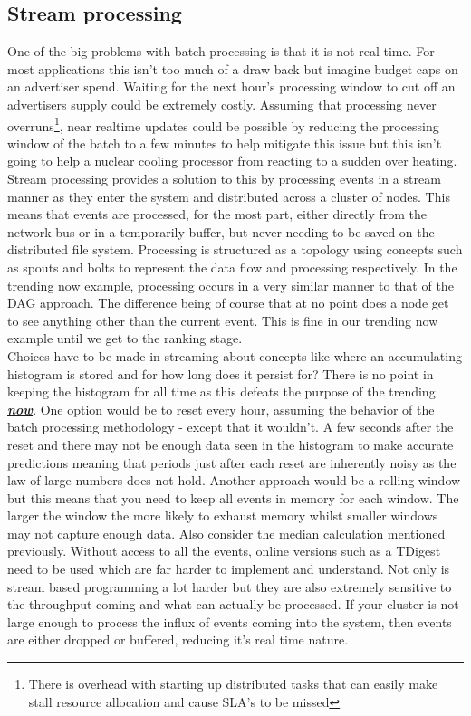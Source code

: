 \documentclass[a4paper,11pt]{scrreprt}
\begin{document}
\subsection{Stream processing}
One of the big problems with batch processing is that it is not real time. For most applications this isn't too much of a draw back but imagine budget caps on an advertiser spend. Waiting for the next hour's processing window to cut off an advertisers supply could be extremely costly. Assuming that processing never overruns\footnote{There is overhead with starting up distributed tasks that can easily make stall resource allocation and cause SLA's to be missed}, near realtime updates could be possible by reducing the processing window of the batch to a few minutes to help mitigate this issue but this isn't going to help a nuclear cooling processor from reacting to a sudden over heating. Stream processing provides a solution to this by processing events in a stream manner as they enter the system and distributed across a cluster of nodes. This means that events are processed, for the most part, either directly from the network bus or in a temporarily buffer, but never needing to be saved on the distributed file system. Processing is structured as a topology using concepts such as spouts and bolts to represent the data flow and processing respectively. In the trending now example, processing occurs in a very similar manner to that of the DAG approach. The difference being of course that at no point does a node get to see anything other than the current event. This is fine in our trending now example until we get to the ranking stage. \\

Choices have to be made in streaming about concepts like where an accumulating histogram is stored and for how long does it persist for? There is no point in keeping the histogram for all time as this defeats the purpose of the trending \textbf{\textit{\underline{now}}}. One option would be to reset every hour, assuming the behavior of the batch processing methodology - except that it wouldn't. A few seconds after the reset and there may not be enough data seen in the histogram to make accurate predictions meaning that periods just after each reset are inherently noisy as the law of large numbers does not hold. Another approach would be a rolling window but this means that you need to keep all events in memory for each window. The larger the window the more likely to exhaust memory whilst smaller windows may not capture enough data. Also consider the median calculation mentioned previously. Without access to all the events, online versions such as a TDigest\cite{tdigest} need to be used which are far harder to implement and understand. Not only is stream based programming a lot harder but they are also extremely sensitive to the throughput coming and what can actually be processed. If your cluster is not large enough to process the influx of events coming into the system, then events are either dropped or buffered, reducing it's real time nature.\\
\end{document}
